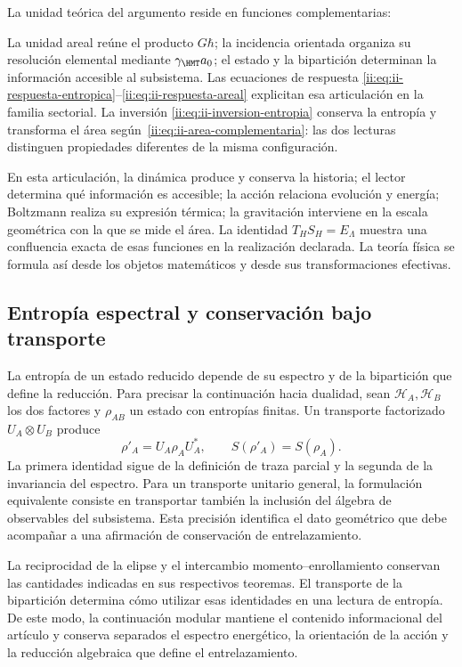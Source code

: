 La unidad teórica del argumento reside en funciones complementarias:

La unidad areal reúne el producto $G\hbar$; la incidencia orientada
organiza su resolución elemental mediante $\gamma_{\HMT}a_0$; el
estado y la bipartición determinan la información accesible al
subsistema. Las ecuaciones de respuesta
\eqref{ii:eq:ii-respuesta-entropica}--\eqref{ii:eq:ii-respuesta-areal}
explicitan esa articulación en la familia sectorial. La inversión
\eqref{ii:eq:ii-inversion-entropia} conserva la entropía y transforma
el área según~\eqref{ii:eq:ii-area-complementaria}: las dos lecturas
distinguen propiedades diferentes de la misma configuración.

En esta articulación,
la dinámica produce y conserva la historia; el lector determina qué
información es accesible; la acción relaciona evolución y energía;
Boltzmann realiza su expresión térmica; la gravitación interviene
en la escala geométrica con la que se mide el área. La identidad
\(T_HS_H=E_\Lambda\) muestra una confluencia exacta de esas funciones
en la realización declarada. La teoría física se formula así desde
los objetos matemáticos y desde sus transformaciones efectivas.

\subsection{Entropía espectral y conservación bajo transporte}

La entropía de un estado reducido depende de su espectro y de la
bipartición que define la reducción. Para precisar la continuación
hacia dualidad, sean \(\mathcal H_A,\mathcal H_B\) los dos factores
y \(\rho_{AB}\) un estado con entropías finitas. Un transporte
factorizado \(U_A\otimes U_B\) produce
\[
 \rho'_A=U_A\rho_AU_A^*,\qquad S(\rho'_A)=S(\rho_A).
\]
La primera identidad sigue de la definición de traza parcial y la
segunda de la invariancia del espectro. Para un transporte unitario
general, la formulación equivalente consiste en transportar también
la inclusión del álgebra de observables del subsistema. Esta precisión
identifica el dato geométrico que debe acompañar a una afirmación
de conservación de entrelazamiento.

La reciprocidad de la elipse y el intercambio momento--enrollamiento
conservan las cantidades indicadas en sus respectivos teoremas. El
transporte de la bipartición determina cómo utilizar esas identidades
en una lectura de entropía. De este modo, la continuación modular
mantiene el contenido informacional del artículo y conserva separados
el espectro energético, la orientación de la acción y la reducción
algebraica que define el entrelazamiento.

